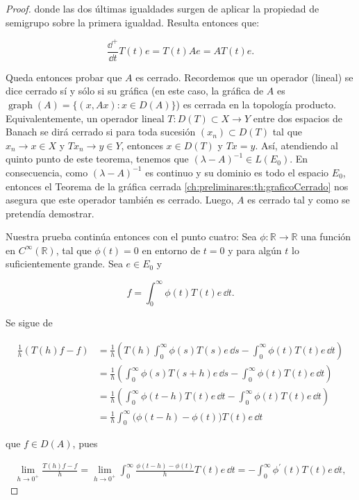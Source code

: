\begin{proof}
    donde las dos últimas igualdades surgen de aplicar la propiedad de semigrupo sobre la primera igualdad. Resulta entonces que:

    \[\frac{\dd^+}{\dd t}T(t)e = T(t)Ae = AT(t)e.\]

    Queda entonces probar que $A$ es cerrado. Recordemos que un operador (lineal) se dice cerrado sí y sólo si su gráfica (en este caso, la gráfica de $A$ es $\operatorname{graph}(A) = \{(x,Ax) : x \in D(A)\}$) es cerrada en la topología producto. Equivalentemente, un operador lineal $T : D(T) \subset X \rightarrow Y$ entre dos espacios de Banach se dirá cerrado si para toda sucesión $(x_n) \subset D(T)$ tal que $x_n \rightarrow x \in X$ y $Tx_n \rightarrow y \in Y$, entonces $x \in D(T)$ y $Tx = y$. Así, atendiendo al quinto punto de este teorema, tenemos que $(\lambda -A)^{-1} \in L(E_0)$. En consecuencia, como $(\lambda - A)^{-1}$ es continuo y su dominio es todo el espacio $E_0$, entonces el Teorema de la gráfica cerrada \ref{ch:preliminares:th:graficoCerrado} nos asegura que este operador también es cerrado. Luego, $A$ es cerrado tal y como se pretendía demostrar.

    Nuestra prueba continúa entonces con el punto cuatro: Sea $\phi : \mathbb{R} \rightarrow \mathbb{R}$ una función en $C^{\infty}(\mathbb{R})$, tal que $\phi(t) = 0$ en entorno de $t = 0$ y para algún $t$ lo suficientemente grande. Sea $e \in E_0$ y

    \[f = \int_0^\infty \phi(t) T(t) e \, \dd t.\]

    Se sigue de

    \begin{align*}
        \frac{1}{h}(T(h)f -f) &= \frac{1}{h}\left ( T(h)\int_0^\infty \phi(s) T(s) e \, \dd s - \int_0^\infty \phi(t) T(t) e \, \dd t \right )\\
        &= \frac{1}{h}\left ( \int_0^\infty \phi(s) T(s + h) e \, \dd s - \int_0^\infty \phi(t) T(t) e \, \dd t \right )\\
        &= \frac{1}{h}\left ( \int_0^\infty \phi(t-h) T(t) e \, \dd t - \int_0^\infty \phi(t) T(t) e \, \dd t \right )\\
        &= \frac{1}{h} \int_0^\infty \Big( \phi(t-h) - \phi(t) \Big ) T(t) e \, \dd t
    \end{align*}

    que $f \in D(A)$, pues

    \begin{align*}
        \lim_{h \rightarrow 0^+} \frac{T(h)f - f}{h} = \lim_{h \rightarrow 0^+}\int_0^\infty \frac{\phi(t-h) - \phi(t)}{h} T(t) e \, \dd t = - \int_0^\infty \phi^{\prime}(t) T(t)e \, \dd t,
    \end{align*}


\end{proof}
